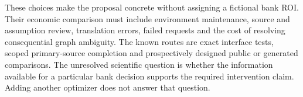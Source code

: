 These choices make the proposal concrete without assigning a fictional bank
ROI. Their economic comparison must include environment maintenance, source
and assumption review, translation errors, failed requests and the cost of
resolving consequential graph ambiguity. The known routes are exact interface
tests, scoped primary-source completion and prospectively designed public or
generated comparisons. The unresolved scientific question is whether the
information available for a particular bank decision supports the required
intervention claim. Adding another optimizer does not answer that question.
\label{exec13:python-discovery-end}
